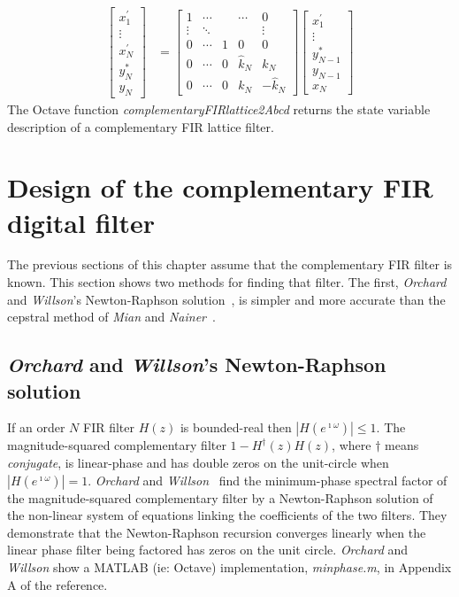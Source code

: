 \documentclass[a4paper,twoside,10pt,english]{report}
\begin{document}
\begin{align*}
\left[\begin{array}{c}
x_{1}^{\prime}\\
\vdots\\
x_{N}^{\prime}\\
y_{N}^{*}\\
y_{N}
\end{array}\right] & = \left[\begin{array}{ccccc}
1 & \cdots &  & \cdots & 0\\
\vdots & \ddots & & & \vdots \\
0 & \cdots & 1 & 0 & 0 \\
0 & \cdots & 0 & \hat{k}_{N} &  k_{N} \\
0 & \cdots &  0 & k_{N} &  -\hat{k}_{N}
\end{array}\right]\left[\begin{array}{c}
x_{1}^{\prime}\\
\vdots\\
y_{N-1}^{*}\\
y_{N-1}\\
x_{N}
\end{array}\right]
\end{align*}
The Octave function \emph{complementaryFIRlattice2Abcd} returns the state
variable description of a complementary FIR lattice filter.

\section{\label{app:Design-of-complementary-FIR-digital-filter}Design of the complementary FIR digital filter}
The previous sections of this chapter assume that the complementary FIR filter
is known. This section shows two methods for finding that filter. The first,
\emph{Orchard} and \emph{Willson}'s Newton-Raphson
solution~\cite{OrchardWillson_ComputationMinimumPhaseSpectralFactor}, is
simpler and more accurate than the cepstral method of \emph{Mian} and
\emph{Nainer}~\cite{MianNainer_FastDesignEquiRippleMinimumPhaseFIR}.
\subsection{\emph{Orchard} and \emph{Willson}'s Newton-Raphson solution}
If an order $N$ FIR filter $H\left(z\right)$ is bounded-real then
$\left|H\left(e^{\imath\omega}\right)\right|\le 1$. The magnitude-squared
complementary filter $1-H^{\dagger}\left(z\right)H\left(z\right)$, where
$\dagger$ means \emph{conjugate}, is linear-phase and has double zeros on the
unit-circle when $\left|H\left(e^{\imath\omega}\right)\right|=1$.
\emph{Orchard} and
\emph{Willson}~\cite{OrchardWillson_ComputationMinimumPhaseSpectralFactor}
find the minimum-phase spectral factor of the magnitude-squared complementary
filter by a Newton-Raphson solution of the non-linear system of equations
linking the coefficients of the two filters. They demonstrate that the
Newton-Raphson recursion converges linearly when the linear phase filter being
factored has zeros on the unit circle. \emph{Orchard} and \emph{Willson} show
a MATLAB (ie: Octave) implementation, \emph{minphase.m}, in Appendix A of the
reference. 
\end{document}
